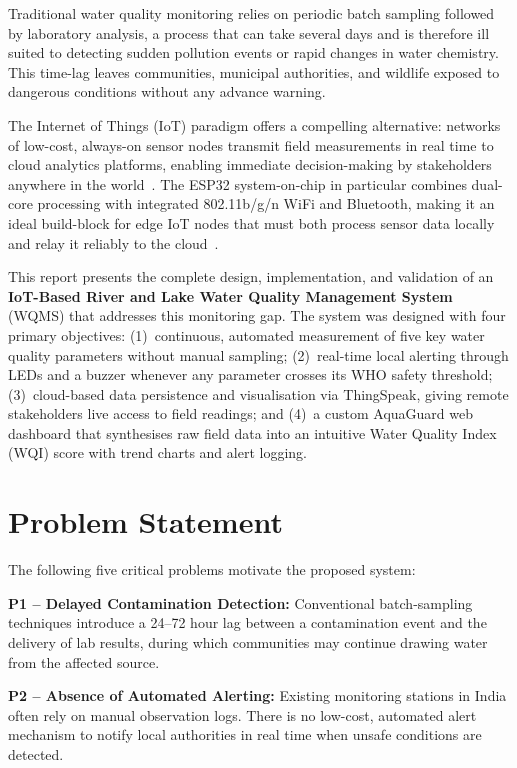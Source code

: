 \documentclass[12pt,a4paper]{article}
\begin{document}
Traditional water quality monitoring relies on periodic batch
sampling followed by laboratory analysis, a process that can take
several days and is therefore ill suited to detecting sudden
pollution events or rapid changes in water chemistry. This
time-lag leaves communities, municipal authorities, and wildlife
exposed to dangerous conditions without any advance warning.

The Internet of Things (IoT) paradigm offers a compelling
alternative: networks of low-cost, always-on sensor nodes
transmit field measurements in real time to cloud analytics
platforms, enabling immediate decision-making by stakeholders
anywhere in the world~\cite{alfuqaha2015}. The ESP32 system-on-chip
in particular combines dual-core processing with integrated 802.11b/g/n
WiFi and Bluetooth, making it an ideal build-block for edge IoT
nodes that must both process sensor data locally and relay it
reliably to the cloud~\cite{esp32ds2023}.

This report presents the complete design, implementation, and
validation of an \textbf{IoT-Based River and Lake Water Quality
Management System} (WQMS) that addresses this monitoring gap. The
system was designed with four primary objectives:
(1)~continuous, automated measurement of five key water quality
parameters without manual sampling;
(2)~real-time local alerting through LEDs and a buzzer whenever
any parameter crosses its WHO safety threshold;
(3)~cloud-based data persistence and visualisation via ThingSpeak,
giving remote stakeholders live access to field readings; and
(4)~a custom AquaGuard web dashboard that synthesises raw field
data into an intuitive Water Quality Index (WQI) score with trend
charts and alert logging.

\section{Problem Statement}
\label{sec:problem}

The following five critical problems motivate the proposed system:

\textbf{P1 -- Delayed Contamination Detection:}
Conventional batch-sampling techniques introduce a 24--72 hour
lag between a contamination event and the delivery of lab results,
during which communities may continue drawing water from the
affected source.

\textbf{P2 -- Absence of Automated Alerting:}
Existing monitoring stations in India often rely on manual
observation logs. There is no low-cost, automated alert
mechanism to notify local authorities in real time when unsafe
conditions are detected.
\end{document}
